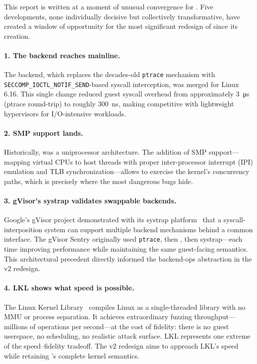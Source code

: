 This report is written at a moment of unusual convergence for \UML{}.  Five
developments, none individually decisive but collectively transformative,
have created a window of opportunity for the most significant redesign of
\UML{} since its creation.

\paragraph{1. The \Seccomp{} backend reaches mainline.}
The \Seccomp{} backend, which replaces the decades-old \texttt{ptrace}
mechanism with \texttt{SECCOMP\_IOCTL\_NOTIF\_SEND}-based syscall interception,
was merged for Linux 6.16.  This single change reduced guest syscall overhead
from approximately \SI{3}{\micro\second} (ptrace round-trip) to roughly
\SI{300}{\nano\second}, making \UML{} competitive with lightweight hypervisors
for I/O-intensive workloads.

\paragraph{2. SMP support lands.}
Historically, \UML{} was a uniprocessor architecture.  The addition of SMP
support---mapping \UML{} virtual CPUs to host threads with proper inter-processor
interrupt (IPI) emulation and TLB synchronization---allows \UML{} to exercise
the kernel's concurrency paths, which is precisely where the most dangerous
bugs hide.

\paragraph{3. gVisor's systrap validates swappable backends.}
Google's gVisor project demonstrated with its systrap platform~\cite{gvisor-systrap}
that a syscall-interposition system can support multiple backend mechanisms
behind a common interface.  The gVisor Sentry originally used \texttt{ptrace},
then \KVM{}, then systrap---each time improving performance while maintaining
the same guest-facing semantics.  This architectural precedent directly informed
the backend-ops abstraction in the \UML{} v2 redesign.

\paragraph{4. \textsc{LKL} shows what speed is possible.}
The Linux Kernel Library~\cite{lkl,purdila2010} compiles Linux as a
single-threaded library with no MMU or process separation.  It achieves
extraordinary fuzzing throughput---millions of operations per second---at
the cost of fidelity: there is no guest userspace, no scheduling, no realistic
attack surface.  \textsc{LKL} represents one extreme of the speed--fidelity
tradeoff.  The \UML{} v2 redesign aims to approach \textsc{LKL}'s speed while
retaining \UML{}'s complete kernel semantics.

